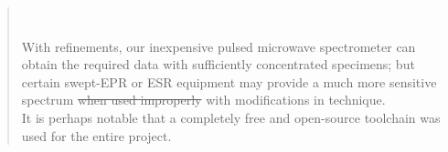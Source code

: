 \documentclass[paper.tex]{subfiles}
\begin{document}
\begin{quotation}
\begin{itemize}
\end{itemize}\

With refinements, our inexpensive pulsed microwave spectrometer can obtain the required data with sufficiently concentrated specimens; but certain swept-EPR or ESR equipment may provide a much more sensitive spectrum \st{when used improperly} with modifications in technique. \\

It is perhaps notable that a completely free and open-source toolchain was used for the entire project.

\end{quotation}
\end{document}
